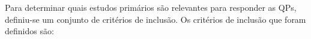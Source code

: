 
Para determinar quais estudos primários são relevantes para responder as QPs, definiu-se um conjunto de critérios de inclusão. Os critérios de inclusão que foram definidos são:

